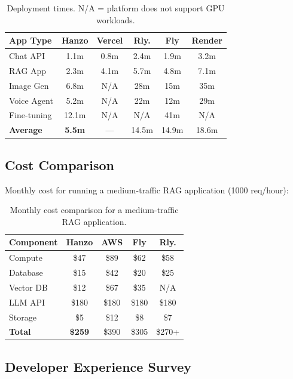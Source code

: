 \begin{table}[H]
\centering
\small
\begin{tabular}{lccccc}
\toprule
\textbf{App Type} & \textbf{Hanzo} & \textbf{Vercel} & \textbf{Rly.} & \textbf{Fly} & \textbf{Render} \\
\midrule
Chat API & 1.1m & 0.8m & 2.4m & 1.9m & 3.2m \\
RAG App & 2.3m & 4.1m & 5.7m & 4.8m & 7.1m \\
Image Gen & 6.8m & N/A & 28m & 15m & 35m \\
Voice Agent & 5.2m & N/A & 22m & 12m & 29m \\
Fine-tuning & 12.1m & N/A & N/A & 41m & N/A \\
\midrule
\textbf{Average} & \textbf{5.5m} & --- & 14.5m & 14.9m & 18.6m \\
\bottomrule
\end{tabular}
\caption{Deployment times. N/A = platform does not support GPU workloads.}
\label{tab:deploy_time}
\end{table}

\subsection{Cost Comparison}

Monthly cost for running a medium-traffic RAG application (1000 req/hour):

\begin{table}[H]
\centering
\small
\begin{tabular}{lcccc}
\toprule
\textbf{Component} & \textbf{Hanzo} & \textbf{AWS} & \textbf{Fly} & \textbf{Rly.} \\
\midrule
Compute & \$47 & \$89 & \$62 & \$58 \\
Database & \$15 & \$42 & \$20 & \$25 \\
Vector DB & \$12 & \$67 & \$35 & N/A \\
LLM API & \$180 & \$180 & \$180 & \$180 \\
Storage & \$5 & \$12 & \$8 & \$7 \\
\midrule
\textbf{Total} & \textbf{\$259} & \$390 & \$305 & \$270+ \\
\bottomrule
\end{tabular}
\caption{Monthly cost comparison for a medium-traffic RAG application.}
\label{tab:cost}
\end{table}

\subsection{Developer Experience Survey}

